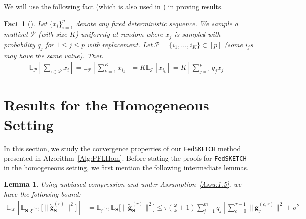 \documentclass[twoside]{article}
\newtheorem{lemma}{Lemma}
\newtheorem{fact}[theorem]{Fact}
\begin{document}
We will use the following fact (which is also used in \cite{li2019convergence,haddadpour2019convergence}) in proving results.
\begin{fact}[\cite{li2019convergence,haddadpour2019convergence}]\label{fact:1}
Let
$\{x_i\}_{i=1}^p$ denote any fixed deterministic sequence. We sample a multiset $\mathcal{P}$ (with size $K$) uniformly at random where $x_j$ is sampled  with probability $q_j$ for $1\leq j\leq p$ with replacement.  Let $\mathcal{P} = \{i_1,\ldots, i_K\} \subset[p]$ (some $i_j$s may have the same value). Then
\begin{align}
    \mathbb{E}_{\mathcal{P}}\left[\sum_{i\in \mathcal{P}}x_i\right]=\mathbb{E}_{\mathcal{P}}\left[\sum_{k=1}^Kx_{i_k}\right]=K\mathbb{E}_{\mathcal{P}}\left[x_{i_k}\right]=K\left[\sum_{j=1}^pq_jx_j\right]
\end{align}
\end{fact}



\section{Results for the Homogeneous Setting}
\label{sec:app:sgd:undrr-pl}



In this section, we study the convergence properties of our  \texttt{FedSKETCH} method presented in Algorithm~\ref{Alg:PFLHom}. Before stating the proofs for \texttt{FedSKETCH} in the homogeneous setting, we first mention the following intermediate lemmas. 



\begin{lemma}\label{lemma:tasbih1-iid}
Using unbiased compression and under Assumption~\ref{Assu:1.5}, we have the following bound: 
\begin{align}
\mathbb{E}_{\mathcal{K}}\left[\mathbb{E}_{{\mathbf{S},\xi^{(r)}}}\Big[\|\tilde{\mathbf{g}}_{\mathbf{S}}^{(r)}\|^2\Big]\right]&=\mathbb{E}_{{\xi}^{(r)}}\mathbb{E}_{\mathbf{S}}\Big[\|\tilde{\mathbf{g}}_\mathbf{S}^{(r)}\|^2\Big]\leq \tau(\frac{\omega}{k}+1)\sum_{j=1}^mq_j\left[\sum_{c=0}^{\tau-1}\|\mathbf{g}_j^{(c,r)}\|^2+\sigma^2\right] \label{eq:lemma1}
\end{align}
\end{lemma}
\end{document}
